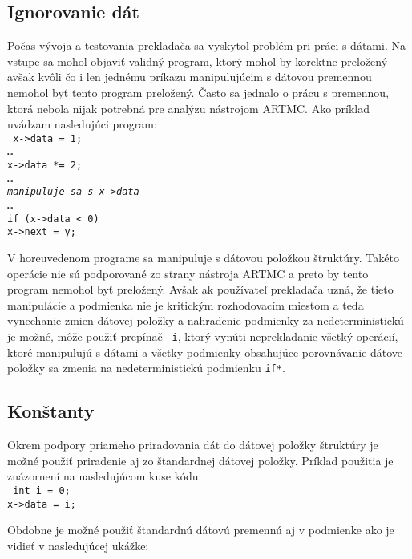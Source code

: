 \subsection{Ignorovanie dát}
Počas vývoja a testovania prekladača sa vyskytol problém pri práci s dátami. Na vstupe sa mohol objaviť validný program, ktorý mohol by korektne preložený avšak kvôli čo i len jednému príkazu manipulujúcim s dátovou premennou nemohol byť tento program preložený. Často sa jednalo o prácu s premennou, ktorá nebola nijak potrebná pre analýzu nástrojom ARTMC. Ako príklad uvádzam nasledujúci program:\\

\noindent
\texttt{
\tab x->data = 1;\\
\tab \dots\\
\tab x->data *= 2;\\
\tab \dots \\
\tab \textit{ manipuluje sa s x->data }\\
\tab \dots\\
\tab if (x->data < 0)\\
\tab \tab x->next = y;\\
}

V horeuvedenom programe sa manipuluje s dátovou položkou štruktúry. Takéto operácie nie sú podporované zo strany nástroja ARTMC a preto by tento program nemohol byť preložený. Avšak ak používateľ prekladača uzná, že tieto manipulácie a podmienka nie je kritickým rozhodovacím miestom a teda vynechanie zmien dátovej položky a nahradenie podmienky za nedeterministickú je možné, môže použiť prepínač \texttt{-i}, ktorý vynúti neprekladanie všetký operácií, ktoré manipulujú s dátami a všetky podmienky obsahujúce porovnávanie dátove položky sa zmenia na nedeterministickú podmienku \texttt{if*}.

\subsection{Konštanty}
Okrem podpory priameho priradovania dát do dátovej položky štruktúry je možné použiť priradenie aj zo štandardnej dátovej položky. Príklad použitia je znázornení na nasledujúcom kuse kódu:\\

\noindent
\texttt{
\tab int i = 0;\\
\tab x->data = i;\\
}

Obdobne je možné použiť štandardnú dátovú premennú aj v podmienke ako je vidieť v nasledujúcej ukážke:\\

